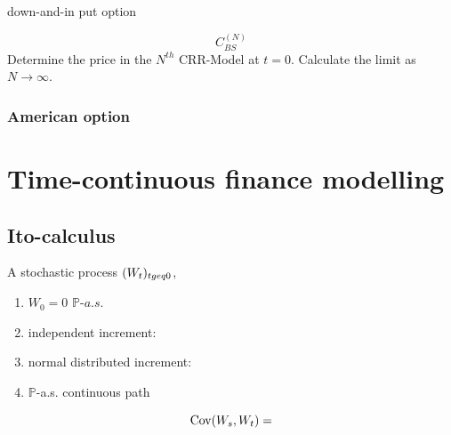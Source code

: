 \begin{exercise}
	down-and-in put option
\end{exercise}

\begin{exercise}
	\begin{equation*}
		C_{BS}^{(N)}
	\end{equation*}
	Determine the price in the $N^{th}$ CRR-Model at $t = 0$. Calculate the limit as $N \rightarrow \infty$. 
\end{exercise}


\subsubsection{American option}




\newpage
\section{Time-continuous finance modelling}
\subsection{Ito-calculus}
\begin{definition}
	A stochastic process $(W_t)_{t \\geq 0}$, 
	\begin{enumerate}
		\item $W_0 = 0$ $\mathbb{P}$-$a.s.$
		\item independent increment:
		\item normal distributed increment:
		\item $\mathbb{P}$-a.s. continuous path
	\end{enumerate}
\end{definition}
\begin{remark}
\begin{equation*}
	\operatorname{Cov}(W_s, W_t) =  
\end{equation*}	
\end{remark}

